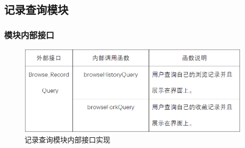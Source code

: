 \subsection{记录查询模块}
\subsubsection{模块内部接口}
\begin{figure}[!htbp]
	\centering
	\includegraphics[scale=0.7]{image/b10.png} %
	\caption{记录查询模块内部接口实现} %
\end{figure}
